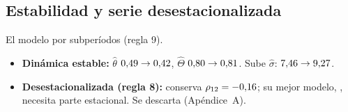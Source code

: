 \documentclass[11pt,a4paper]{article}
\newcommand{\tabla}[3]{\begin{table}[H]\centering\small\begin{adjustbox}{max width=\linewidth}\end{adjustbox}\caption{#2}\label{#3}\end{table}}
\begin{document}
\subsection{Estabilidad y serie desestacionalizada}\label{sec:estab}
\tabla{04_estabilidad.tex}{El modelo por subper\'iodos (regla 9).}{tab:estab}
\begin{itemize}
\item \textbf{Din\'amica estable:} $\hat\theta$ $0{,}49\to0{,}42$, $\hat\Theta$ $0{,}80\to0{,}81$. Sube $\hat\sigma$: $7{,}46\to9{,}27$.
\item \textbf{Desestacionalizada (regla 8):} conserva $\rho_{12}=-0{,}16$; su mejor modelo, \SAmodelo, necesita parte estacional. Se descarta (Ap\'endice~A).
\end{itemize}

\end{document}
